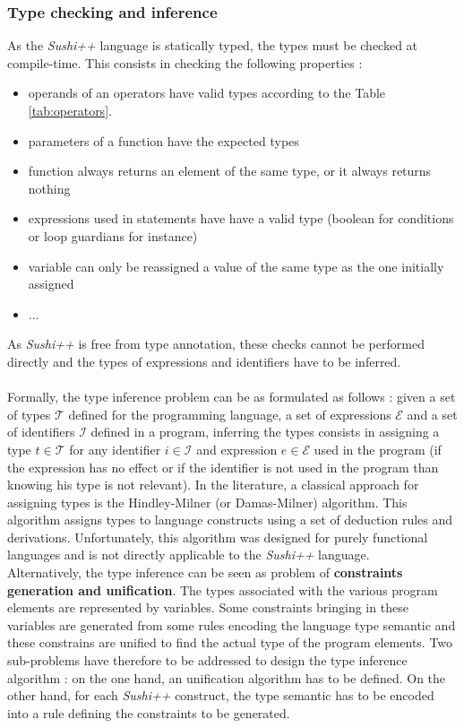 \documentclass[a4paper,11pt]{article}
\begin{document}
\subsubsection{Type checking and inference}
As the \textit{Sushi++} language is statically typed, the types must be checked at compile-time. This consists in checking the following properties :
\begin{itemize}
	\item operands of an operators have valid types according to the Table \ref{tab:operators}.
	\item parameters of a function have the expected types
	\item function always returns an element of the same type, or it always returns nothing
	\item expressions used in statements have have a valid type (boolean for conditions or loop guardians for instance)
	\item variable can only be reassigned a value of the same type as the one initially assigned
	\item ...
\end{itemize}
As \textit{Sushi++} is free from type annotation, these checks cannot be performed directly and the types of expressions and identifiers have to be inferred. 
\paragraph{}
Formally, the type inference problem can be as formulated as follows : given a set of types $\mathcal{T}$ defined for the programming language, a set of expressions $\mathcal{E}$ and a set of identifiers $\mathcal{I}$ defined in a program, inferring the types consists in assigning a type $t \in \mathcal{T}$ for any identifier $i \in \mathcal{I}$ and expression $e \in \mathcal{E}$ used in the program (if the expression has no effect or if the identifier is not used in the program than knowing his type is not relevant). In the literature, a classical approach for assigning types is the Hindley-Milner (or Damas-Milner) algorithm. This algorithm assigns types to language constructs using a set of deduction rules and derivations. Unfortunately, this algorithm was designed for purely functional languages and is not directly applicable to the \textit{Sushi++} language. \\
Alternatively, the type inference can be seen as problem of \textbf{constraints generation and unification}. The types associated with the various program elements are represented by variables. Some constraints bringing in these variables are generated from some rules encoding the language type semantic and these constrains are unified to find the actual type of the program elements. Two sub-problems have therefore to be addressed to design the type inference algorithm : on the one hand, an unification algorithm has to be defined. On the other hand, for each \textit{Sushi++} construct, the type semantic has to be encoded into a rule defining the constraints to be generated.
\end{document}
